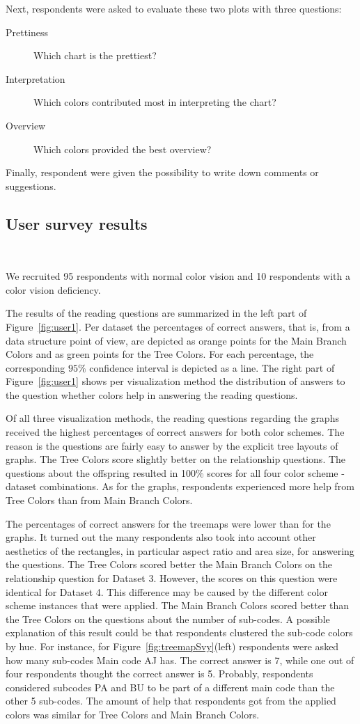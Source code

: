 \documentclass[journal]{vgtc}                %
\begin{document}
Next, respondents were asked to evaluate these two plots with three questions:
\begin{description}
\item[Prettiness] Which chart is the prettiest?
\item[Interpretation] Which colors contributed most in interpreting the chart?
\item[Overview] Which colors provided the best overview?
\end{description}
Finally, respondent were given the possibility to write down comments or suggestions.

\subsection{User survey results}~\label{secuserres}

We recruited 95 respondents with normal color vision and 10 respondents with a color vision deficiency.

The results of the reading questions are summarized in the left part of Figure~\ref{fig:user1}. Per dataset the percentages of correct answers, that is, from a data structure point of view, are depicted as orange points for the Main Branch Colors and as green points for the Tree Colors. For each percentage, the corresponding $95\%$ confidence interval is depicted as a line. The right part of Figure~\ref{fig:user1} shows per visualization method the distribution of answers to the question whether colors help in answering the reading questions.

Of all three visualization methods, the reading questions regarding the graphs received the highest percentages of correct answers for both color schemes. The reason is the questions are fairly easy to answer by the explicit tree layouts of graphs. The Tree Colors score slightly better on the relationship questions. The questions about the offspring resulted in 100\% scores for all four color scheme - dataset combinations. As for the graphs, respondents experienced more help from Tree Colors than from Main Branch Colors.


The percentages of correct answers for the treemaps were lower than for the graphs. It turned out the many respondents also took into account other aesthetics of the rectangles, in particular aspect ratio and area size, for answering the questions. The Tree Colors scored better the Main Branch Colors on the relationship question for Dataset 3. However, the scores on this question were identical for Dataset 4. This difference may be caused by the different color scheme instances that were applied. The Main Branch Colors scored better than the Tree Colors on the questions about the number of sub-codes. A possible explanation of this result could be that respondents clustered the sub-code colors by hue. For instance, for Figure~\ref{fig:treemapSvy}(left) respondents were asked how many sub-codes Main code AJ has. The correct answer is 7, while one out of four respondents thought the correct answer is 5. Probably, respondents considered subcodes PA and BU to be part of a different main code than the other 5 sub-codes. The amount of help that respondents got from the applied colors was similar for Tree Colors and Main Branch Colors.
\end{document}
